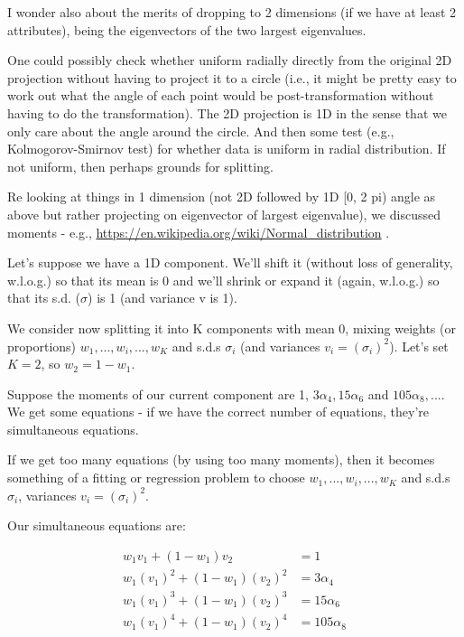 \documentclass{elsarticle}
\begin{document}
I wonder also about the merits of dropping to 2 dimensions (if we have at least 2 attributes), being the eigenvectors of the two largest eigenvalues. 

One could possibly check whether uniform radially directly from the original 2D projection without having to project it to a circle (i.e., it might be pretty easy to work out what the angle of each point would be post-transformation without having to do the transformation).  The 2D projection is 1D in the sense that we only care about the angle around the circle.  And then some test (e.g., Kolmogorov-Smirnov test) for whether data is uniform in radial distribution.  If not uniform, then perhaps grounds for splitting.

Re looking at things in 1 dimension (not 2D followed by 1D [0, 2 pi) angle
as above but rather projecting on eigenvector of largest eigenvalue), we
discussed moments - e.g., \url{https://en.wikipedia.org/wiki/Normal_distribution} .


Let's suppose we have a 1D component.  We'll shift it (without loss of
generality, w.l.o.g.) so that its mean is 0 and we'll shrink or expand it
(again, w.l.o.g.) so that its s.d. ($\sigma$) is 1 (and variance v is 1).

We consider now splitting it into K components with mean 0,
mixing weights (or proportions) $w_1, ..., w_i, ..., w_K$ and s.d.s $\sigma_i$ (and variances $v_i = (\sigma_i)^2$).
Let's set $K = 2$, so $w_2 = 1 - w_1$.

Suppose the moments of our current component are 1, $3 \alpha_4, 15 \alpha_6$ and $105 \alpha_8, ... $.
We get some equations - if we have the correct number of equations,
they're simultaneous equations.

If we get too many equations (by using too many moments), then it
becomes something of a fitting or regression problem to choose
$w_1, ..., w_i, ..., w_K$ and s.d.s $\sigma_i$, variances $v_i = (\sigma_i)^2$.

Our simultaneous equations are:

\begin{align*}
w_1 v_1       + (1 - w_1) v_2       &=    1\\
w_1 (v_1)^2  + (1 - w_1) (v_2)^2  &=    3 \alpha_4\\
w_1 (v_1)^3  + (1 - w_1) (v_2)^3  &=   15 \alpha_6\\
w_1 (v_1)^4  + (1 - w_1) (v_2)^4  &=  105 \alpha_8
\end{align*}
\end{document}
